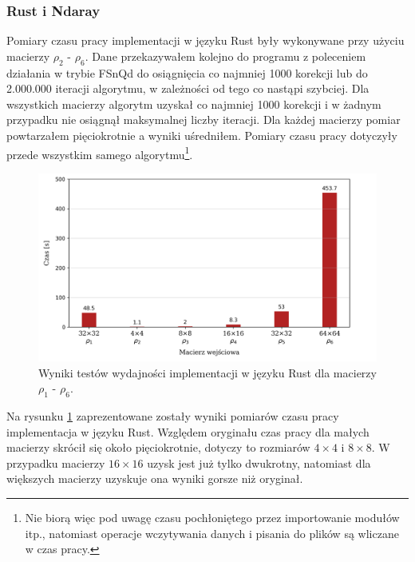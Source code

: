 \documentclass[11pt, a4paper]{article}
\begin{document}
\begin{sloppypar}
    \FloatBarrier

    \subsubsection{ Rust i Ndaray}


    Pomiary czasu pracy implementacji w języku Rust były wykonywane przy użyciu macierzy
    $\rho_{2}$ - $\rho_{6}$. Dane przekazywałem kolejno do programu z poleceniem działania
    w trybie FSnQd do osiągnięcia co najmniej 1000 korekcji lub do 2.000.000 iteracji
    algorytmu, w zależności od tego co nastąpi szybciej. Dla wszystkich macierzy
    algorytm uzyskał co najmniej 1000 korekcji i w żadnym przypadku nie osiągnął
    maksymalnej liczby iteracji. Dla każdej macierzy pomiar powtarzałem pięciokrotnie a wyniki
    uśredniłem. Pomiary czasu pracy dotyczyły przede wszystkim samego algorytmu\footnote{Nie
    biorą więc pod uwagę czasu pochłoniętego przez importowanie modułów itp., natomiast operacje
    wczytywania danych i pisania do plików są wliczane w czas pracy.}.

    \begin{figure}[!ht]
      \centering
      \includegraphics[width=1.0\textwidth]{"resources/rust_performance_tests.png"}
      \caption{Wyniki testów wydajności implementacji w języku Rust dla macierzy $\rho_{1}$ - $\rho
      _{6}$.}
      \label{rust-double-precision}
    \end{figure}

    Na rysunku \ref{rust-double-precision} zaprezentowane zostały wyniki pomiarów czasu
    pracy implementacja w języku Rust. Względem oryginału czas pracy dla małych macierzy
    skrócił się około pięciokrotnie, dotyczy to rozmiarów $4\times4$ i $8\times8$. W przypadku
    macierzy $16\times16$ uzysk jest już tylko dwukrotny, natomiast dla większych
    macierzy uzyskuje ona wyniki gorsze niż oryginał.


\end{sloppypar}
\end{document}
